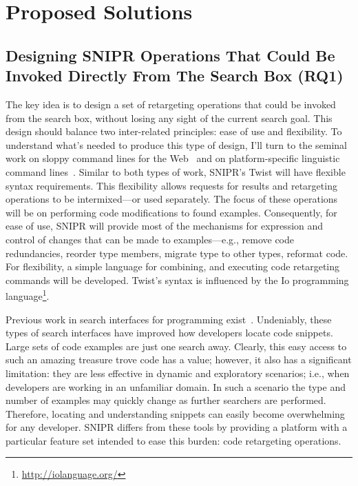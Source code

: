 \documentclass[conference]{IEEEtran}
\begin{document}
\section{Proposed Solutions}
\subsection{Designing \uppercase{SnipR} Operations That Could Be Invoked Directly From The Search Box (RQ1)}
\label{sec:rq1}
The key idea is to design a set of retargeting operations that could be invoked from the search box, without losing any sight of the current search goal. This design should balance two inter-related principles: ease of use and flexibility. To understand what's needed to produce this type of design, I'll turn to the seminal work on sloppy command lines for the Web~\cite{Little:2007dh, Miller:2008ge} and on platform-specific linguistic command lines~\cite{Raskin:2008wb}. Similar to both types of work, \uppercase{SnipR}'s Twist will have flexible syntax requirements. This flexibility allows requests for results and retargeting operations to be intermixed---or used separately. The focus of these operations will be on performing code modifications to found examples. Consequently, for ease of use, \uppercase{SnipR} will provide most of the mechanisms for expression and control of changes that can be made to examples---e.g., remove code redundancies, reorder type members, migrate type to other types, reformat code. For flexibility, a simple language for combining, and executing code retargeting commands will be developed. Twist's syntax is influenced by the Io programming language\footnote{\url{http://iolanguage.org/}}.

Previous work in search interfaces for programming exist~\cite{Brandt:2010tp, Bajracharya:2010um, Hummel:eq, Reiss:2009fu}. Undeniably, these types of search interfaces have improved how developers locate code snippets. Large sets of code examples are just one search away. Clearly, this easy access to such an amazing treasure trove code has a value; however, it also has a significant limitation: they are less effective in dynamic and exploratory scenarios; i.e., when developers are working in an unfamiliar domain. In such a scenario the type and number of examples may quickly change as further searchers are performed. Therefore, locating and understanding snippets can easily become overwhelming for any developer. \uppercase{SnipR} differs from these tools by providing a platform with a particular feature set intended to ease this burden: code retargeting operations. 
\end{document}
